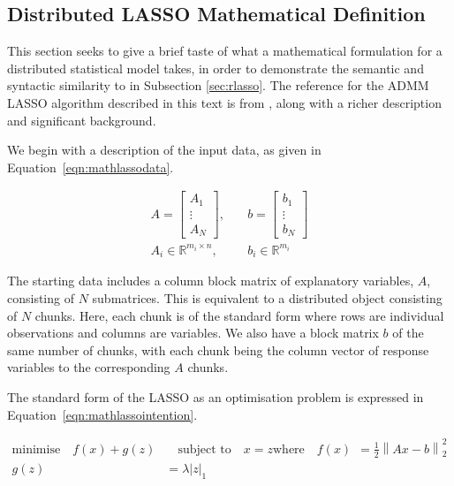 \documentclass[letterpaper, inpress]{jds} %
\begin{document}
\subsection{Distributed LASSO Mathematical Definition}\label{sec:mathlasso}

This section seeks to give a brief taste of what a mathematical formulation for a distributed statistical model takes, in order to demonstrate the semantic and syntactic similarity to  in Subsection \ref{sec:rlasso}.
The reference for the ADMM LASSO algorithm described in this text is from \citet{boyd2011}, along with a richer description and significant background.

We begin with a description of the input data, as given in Equation~\ref{eqn:mathlassodata}.

\begin{equation}
\begin{aligned}\label{eqn:mathlassodata}
    A = \begin{bmatrix}
        A_1\\
        \vdots \\
        A_N
    \end{bmatrix},&
    \quad b=\begin{bmatrix}
        b_1\\
        \vdots \\
        b_N
    \end{bmatrix}\\
    A_i \in \mathbb{R}^{m_i\times n},& \quad b_i \in \mathbb{R}^{m_i}
\end{aligned}
\end{equation}

The starting data includes a column block matrix of explanatory variables, $A$, consisting of $N$ submatrices.
This is equivalent to a distributed object consisting of $N$ chunks.
Here, each chunk is of the standard form where rows are individual observations and columns are variables.
We also have a block matrix $b$ of the same number of chunks, with each chunk being the column vector of response variables to the corresponding $A$ chunks.

The standard form of the LASSO as an optimisation problem is expressed in Equation~\ref{eqn:mathlassointention}.

\begin{equation}\label{eqn:mathlassointention}
    \begin{aligned}
        \text{minimise} \quad f(x) + g(z) &\quad \text{subject to} \quad x = z
        \text {where} \quad f(x) &= \frac{1}{2} \left\| Ax - b \right\|^2_2 \\
        g(z) &= \lambda \left| z \right|_1 \\
    \end{aligned} 
\end{equation}
\end{document}
